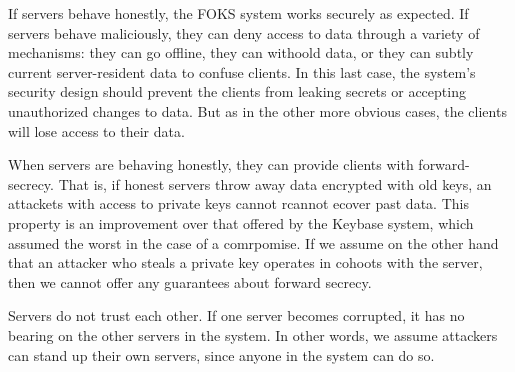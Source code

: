 If servers behave honestly, the FOKS system works securely as expected.  If
servers behave maliciously, they can deny access to data through a variety of
mechanisms: they can go offline, they can withoold data, or they can subtly
current server-resident data to confuse clients. In this last case, the system's
security design should prevent the clients from leaking secrets or accepting
unauthorized changes to data. But as in the other more obvious cases, the
clients will lose access to their data.

When servers are behaving honestly, they can provide clients with
forward-secrecy. That is, if honest servers throw away data encrypted with old
keys, an attackets with access to private keys cannot rcannot ecover past data.
This property is an improvement over that offered by the Keybase system, which
assumed the worst in the case of a comrpomise. If we assume on the other hand
that an attacker who steals a private key operates in cohoots with the server,
then we cannot offer any guarantees about forward secrecy.

Servers do not trust each other. If one server becomes corrupted, it has no
bearing on the other servers in the system. In other words, we assume attackers
can stand up their own servers, since anyone in the system can do so.

